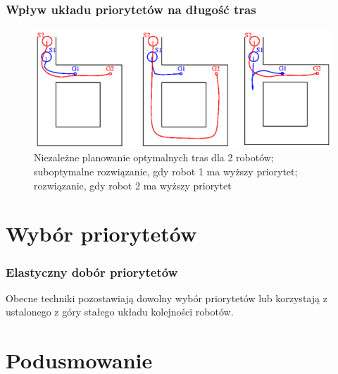 \subsubsection{Wpływ układu priorytetów na długość tras}
\begin{figure}[htp]
	\centering
	\includegraphics[width=\textwidth,height=0.6\textheight,keepaspectratio]{img/article1/ppt6}
	\caption{Niezależne planowanie optymalnych tras dla 2 robotów; suboptymalne rozwiązanie, gdy robot 1 ma wyższy priorytet; rozwiązanie, gdy robot 2 ma wyższy priorytet}
\end{figure}

\section{Wybór priorytetów}
\subsubsection{Elastyczny dobór priorytetów}
Obecne techniki pozostawiają dowolny wybór priorytetów lub korzystają z ustalonego z góry stałego układu kolejności robotów. \\

\section{Podusmowanie}
